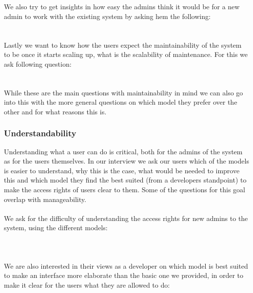 \textbf{ }
\\
\\
We also try to get insights in how easy the admins think it would be for a new admin to work with the existing system by asking hem the following:
\\

\textbf{ }
\\
\\
Lastly we want to know how the users expect the maintainability of the system to be once it starts scaling up, what is the scalability of maintenance. For this we ask following question:
\\

\textbf{ }
\\
\\
While these are the main questions with maintainability in mind we can also go into this with the more general questions on which model they prefer over the other and for what reasons this is.
\\
\subsubsection{Understandability}
Understanding what a user can do is critical, both for the admins of the system as for the users themselves.
In our interview we ask our users which of the models is easier to understand, why this is the case, what would be needed to improve this and which model they find the best suited (from a developers standpoint) to make the access rights of users clear to them.
Some of the questions for this goal overlap with manageability.
\\
\\
We ask for the difficulty of understanding the access rights for new admins to the system, using the different models:
\\

\textbf{ }
\\
\\
\\
We are also interested in their views as a developer on which model is best suited to make an interface more elaborate than the basic one we provided, in order to make it clear for the users what they are allowed to do:
\\

